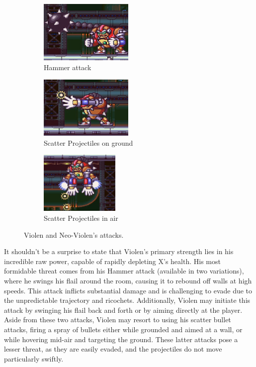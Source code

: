 \begin{figure}[htp]
	\centering
	\begin{subfigure}{0.45\linewidth}
		\centering
		\includegraphics[height=3cm]{figures/X2/Hunter_stages/Violen_swing.png}
		\caption{Hammer attack}
	\end{subfigure}
	\begin{subfigure}{0.45\linewidth}
		\centering
		\includegraphics[height=3cm]{figures/X2/Hunter_stages/Violen_bullet.png}
		\caption{Scatter Projectiles on ground}
	\end{subfigure}
	\begin{subfigure}{0.4\linewidth}
		\centering
		\includegraphics[height=3cm]{figures/X2/Hunter_stages/Violen_air_bullet.png}
		\caption{Scatter Projectiles in air}
	\end{subfigure}
	\caption{Violen and Neo-Violen's attacks.}	
\end{figure}
It shouldn't be a surprise to state that Violen's primary strength lies in his incredible raw power, capable of rapidly depleting X's health. His most formidable threat comes from his Hammer attack (available in two variations), where he swings his flail around the room, causing it to rebound off walls at high speeds. This attack inflicts substantial damage and is challenging to evade due to the unpredictable trajectory and ricochets. Additionally, Violen may initiate this attack by swinging his flail back and forth or by aiming directly at the player. Aside from these two attacks, Violen may resort to using his scatter bullet attacks, firing a spray of bullets either while grounded and aimed at a wall, or while hovering mid-air and targeting the ground. These latter attacks pose a lesser threat, as they are easily evaded, and the projectiles do not move particularly swiftly.

